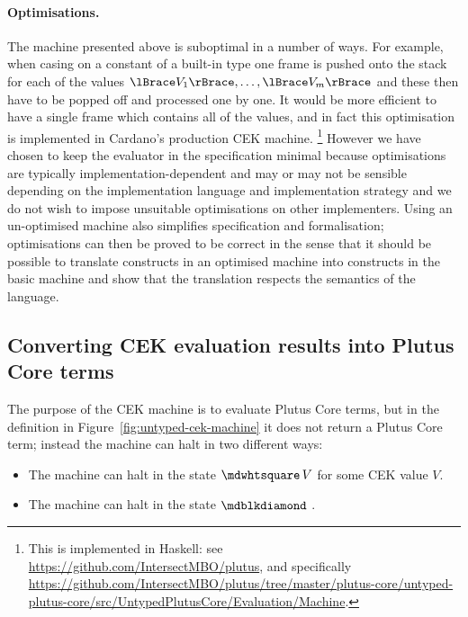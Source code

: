 \paragraph{Optimisations.}  The machine presented above is suboptimal in a number
of ways.  For example, when casing on a constant of a built-in type one frame
is pushed onto the stack for each of the values $\reify{V_1}, \ldots,
\reify{V_m}$ and these then have to be popped off and processed one by one. It
would be more efficient to have a single frame which contains all of the values,
and in fact this optimisation is implemented in Cardano's production CEK
machine.%
\footnote{This is implemented in Haskell: see
\url{https://github.com/IntersectMBO/plutus}, and specifically
\url{https://github.com/IntersectMBO/plutus/tree/master/plutus-core/untyped-plutus-core/src/UntypedPlutusCore/Evaluation/Machine}.}
However we have chosen to keep the evaluator in the specification minimal
because optimisations are typically implementation-dependent and may or may not
be sensible depending on the implementation language and implementation strategy
and we do not wish to impose unsuitable optimisations on other implementers.
Using an un-optimised machine also simplifies specification and formalisation;
optimisations can then be proved to be correct in the sense that it should be
possible to translate constructs in an optimised machine into constructs in the
basic machine and show that the translation respects the semantics of the
language.

\subsection{Converting CEK evaluation results into Plutus Core terms}
The purpose of the CEK machine is to evaluate Plutus Core terms, but in the
definition in Figure~\ref{fig:untyped-cek-machine} it does not return a Plutus
Core term; instead the machine can halt in two different ways:
\begin{itemize}
\item The machine can halt in the state $\cekhalt{V}$ for some CEK value $V$.
\item The machine can halt in the state $\cekerror{}$ .
\end{itemize}

